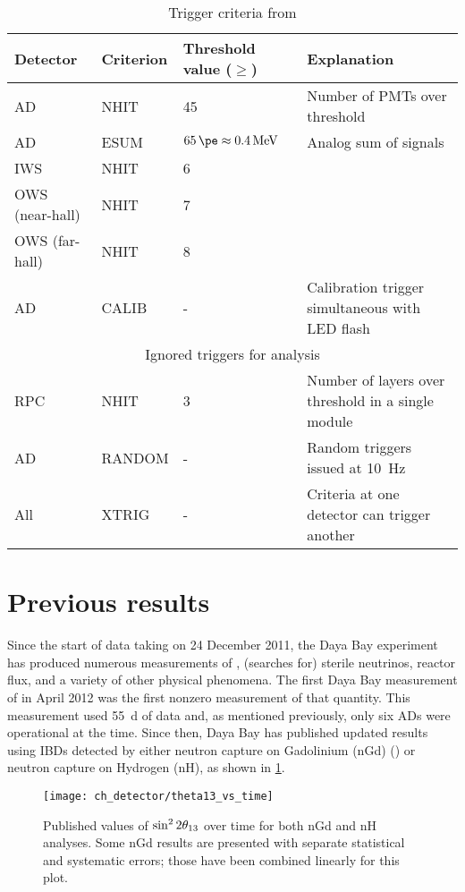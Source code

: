 \begin{table}[ht]
    \centering
    \begin{tabular}[t]{lllp{6cm}}
        \hline
        Detector & Criterion & Threshold value ($\geq$) & Explanation\\
        \hline
        AD & NHIT & \num{45} & Number of PMTs over threshold \\
        AD & ESUM & $\SI{65}{\pe}\approx \SI{0.4}{\MeV}$ & Analog sum of signals \\
        IWS & NHIT & \num{6} & \\
        OWS (near-hall) & NHIT & \num{7} & \\
        OWS (far-hall) & NHIT & \num{8} & \\
        AD & CALIB & - & Calibration trigger simultaneous with LED flash \\
        \hline
        \multicolumn{4}{c}{Ignored triggers for \thetaot{} analysis} \\
                       \hline
        RPC & NHIT & \num{3} & Number of layers over threshold in a single module \\
        AD & RANDOM & - & Random triggers issued at \SI{10}{\Hz} \\
        All & XTRIG & - & Criteria at one detector can trigger another \\
        \hline
    \end{tabular}
    \caption{Trigger criteria from \cite{ngd2016}}
    \label{tab:trigger}
\end{table}


\section{Previous results}

Since the start of data taking on 24 December 2011,
the Daya Bay experiment has produced numerous measurements of
\thetaot{}, (searches for) sterile neutrinos, reactor \nuebar{} flux,
and a variety of other physical phenomena.
The first Daya Bay measurement of \thetaot{} in April 2012
was the first nonzero measurement of that quantity.
This measurement used \SI{55}{\day} of \nuebar{} data
and, as mentioned previously, only six ADs were operational at the time.
Since then, Daya Bay has published updated results using IBDs detected by
either neutron capture on Gadolinium (nGd)
(\cite{ngd2012,ngd2013,ngd2014,ngd2015,ngd2016,ngd2018}) or neutron capture on Hydrogen (nH),
as shown in \cref{fig:theta13_vs_t}.

\begin{figure}
    \centering
    \texttt{[image: ch\_detector/theta13\_vs\_time]}
    \caption{
        Published values of $\sin^{2}2\theta_{13}$ over time
        for both nGd and nH analyses.
        Some nGd results are presented with separate statistical
        and systematic errors;
        those have been combined linearly for this plot.
    }
    \label{fig:theta13_vs_t}
\end{figure}

